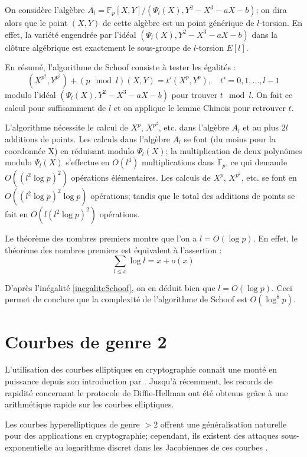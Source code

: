 \documentclass[a4paper]{article}
\theoremstyle{definition}
\theoremstyle{remark}
\numberwithin{equation}{section}
\begin{document}
On considère l'algèbre $A_l=\mathbb{F}_p[X,Y]/(\Psi_l(X),Y^2-X^3-aX-b)$; on dira alors que le point $(X,Y)$ de cette algèbre est un point générique de $l$-torsion. En effet, la variété engendrée par l'idéal $(\Psi_l(X),Y^2-X^3-aX-b)$ dans la clôture algébrique est exactement le sous-groupe de $l$-torsion $E[l]$.

En résumé, l'algorithme de Schoof consiste à tester les égalités :
\begin{equation}
\label{polCarFrob}
(X^{p^2},Y^{p^2}) + (p \mod l)(X,Y) = t'(X^p,Y^p), \quad t' = 0,1,...,l-1
\end{equation}
modulo l'idéal $(\Psi_l(X),Y^2-X^3-aX-b)$ pour trouver $t \mod l$. On fait ce calcul pour suffisamment de $l$ et on applique le lemme Chinois pour retrouver $t$.

L'algorithme nécessite le calcul de $X^p$, $X^{p^2}$, etc. dans l'algèbre $A_l$ et au plus $2l$ additions de points. Les calculs dans l'algèbre $A_l$ se font (du moins pour la coordonnée X) en réduisant modulo $\Psi_l(X)$; la multiplication de deux polynômes modulo $\Psi_l(X)$ s'effectue en $O(l^4)$ multiplications dans $\mathbb{F}_p$, ce qui demande $O((l^2\log p)^2)$ opérations élémentaires. Les calculs de $X^p$, $X^{p^2}$, etc. se font en $O((l^2\log p)^2\log p)$ opérations; tandis que le total des additions de points se fait en $O(l(l^2\log p)^2)$ opérations.

Le théorème des nombres premiers montre que l'on a $l = O(\log p)$. En effet, le théorème des nombres premiers est équivalent à l'assertion :
$$\sum_{l \leq x}\log l = x + o(x)$$

D'après l'inégalité \ref{inegaliteSchoof}, on en déduit bien que $l = O(\log p)$. Ceci permet de conclure que la complexité de l'algorithme de Schoof est $O(\log^8 p)$.

\section{Courbes de genre 2}

L'utilisation des courbes elliptiques en cryptographie connait une monté en puissance depuis son introduction par \citet{koblitz1}. Jusqu'à récemment, les records de rapidité concernant le protocole de Diffie-Hellman ont été obtenus grâce à une arithmétique rapide sur les courbes elliptiques.

Les courbes hyperelliptiques de genre $> 2$ offrent une généralisation naturelle pour des applications en cryptographie; cependant, ils existent des attaques sous-exponentielle au logarithme discret dans les Jacobiennes de ces courbes \citep{gaudry2}.
\end{document}
